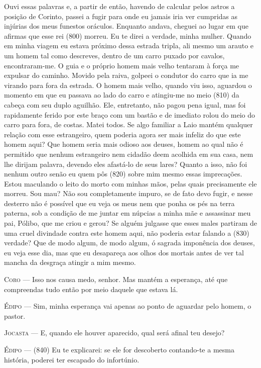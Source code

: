 Ouvi essas palavras e, a partir de então, havendo de calcular pelos
astros a posição de Corinto, passei a fugir para onde eu jamais iria ver
cumpridas as injúrias dos meus funestos oráculos. Enquanto andava,
cheguei ao lugar em que afirmas que esse rei (800) morreu. Eu te direi a
verdade, minha mulher. Quando em minha viagem eu estava próximo dessa
estrada tripla, ali mesmo um arauto e um homem tal como descreves,
dentro de um carro puxado por cavalos, encontraram-me. O guia e o
próprio homem mais velho tentaram à força me expulsar do caminho. Movido
pela raiva, golpeei o condutor do carro que ia me virando para fora da
estrada. O homem mais velho, quando viu isso, aguardou o momento em que
eu passava ao lado do carro e atingiu-me no meio (810) da cabeça com seu
duplo aguilhão. Ele, entretanto, não pagou pena igual, mas foi
rapidamente ferido por este braço com um bastão e de imediato rolou do
meio do carro para fora, de costas. Matei todos. Se algo familiar a Laio
mantém qualquer relação com esse estrangeiro, quem poderia agora ser
mais infeliz do que este homem aqui? Que homem seria mais odioso aos
deuses, homem ao qual não é permitido que nenhum estrangeiro nem cidadão
deem acolhida em sua casa, nem lhe dirijam palavra, devendo eles
afastá-lo de seus lares? Quanto a isso, não foi nenhum outro senão eu
quem pôs (820) sobre mim mesmo essas imprecações. Estou maculando o
leito do morto com minhas mãos, pelas quais precisamente ele morreu. Sou
mau? Não sou completamente impuro, se de fato devo fugir, e nesse
desterro não é possível que eu veja os meus nem que ponha os pés na
terra paterna, sob a condição de me juntar em núpcias a minha mãe e
assassinar meu pai, Pólibo, que me criou e gerou? Se alguém julgasse que
esses males partiram de uma cruel divindade contra este homem aqui, não
poderia estar falando a (830) verdade? Que de modo algum, de modo algum,
ó sagrada imponência dos deuses, eu veja esse dia, mas que eu desapareça
aos olhos dos mortais antes de ver tal mancha da desgraça atingir a mim
mesmo.

\textsc{Coro} --- Isso nos causa medo, senhor. Mas mantém a esperança, até que compreendas
tudo então por meio daquele que estava lá.

\textsc{Édipo} --- Sim, minha esperança vai apenas ao ponto de aguardar pelo homem, o
pastor.

\textsc{Jocasta} --- E, quando ele houver aparecido, qual será afinal teu desejo?

\textsc{Édipo} --- (840) Eu te explicarei: se ele for descoberto contando-te a mesma
história, poderei ter escapado do infortúnio.

